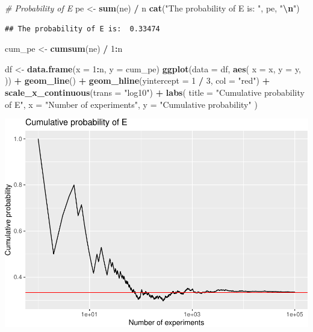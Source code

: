 \documentclass[
]{article}
\newenvironment{Shaded}{\begin{snugshade}}{\end{snugshade}}
\newcommand{\AttributeTok}[1]{\textcolor[rgb]{0.13,0.29,0.53}{#1}}
\newcommand{\CommentTok}[1]{\textcolor[rgb]{0.56,0.35,0.01}{\textit{#1}}}
\newcommand{\DecValTok}[1]{\textcolor[rgb]{0.00,0.00,0.81}{#1}}
\newcommand{\FunctionTok}[1]{\textcolor[rgb]{0.13,0.29,0.53}{\textbf{#1}}}
\newcommand{\NormalTok}[1]{#1}
\newcommand{\OtherTok}[1]{\textcolor[rgb]{0.56,0.35,0.01}{#1}}
\newcommand{\SpecialCharTok}[1]{\textcolor[rgb]{0.81,0.36,0.00}{\textbf{#1}}}
\newcommand{\StringTok}[1]{\textcolor[rgb]{0.31,0.60,0.02}{#1}}
\begin{document}
\begin{Shaded}
\begin{Highlighting}[]
\CommentTok{\# Probability of E}
\NormalTok{pe }\OtherTok{\textless{}{-}} \FunctionTok{sum}\NormalTok{(ne) }\SpecialCharTok{/}\NormalTok{ n}
\FunctionTok{cat}\NormalTok{(}\StringTok{"The probability of E is: "}\NormalTok{, pe, }\StringTok{"}\SpecialCharTok{\textbackslash{}n}\StringTok{"}\NormalTok{)}
\end{Highlighting}
\end{Shaded}

\begin{verbatim}
## The probability of E is:  0.33474
\end{verbatim}

\begin{Shaded}
\begin{Highlighting}[]
\NormalTok{cum\_pe }\OtherTok{\textless{}{-}} \FunctionTok{cumsum}\NormalTok{(ne) }\SpecialCharTok{/} \DecValTok{1}\SpecialCharTok{:}\NormalTok{n}

\NormalTok{df }\OtherTok{\textless{}{-}} \FunctionTok{data.frame}\NormalTok{(}\AttributeTok{x =} \DecValTok{1}\SpecialCharTok{:}\NormalTok{n, }\AttributeTok{y =}\NormalTok{ cum\_pe)}
\FunctionTok{ggplot}\NormalTok{(}\AttributeTok{data =}\NormalTok{ df, }\FunctionTok{aes}\NormalTok{(}
  \AttributeTok{x =}\NormalTok{ x, }\AttributeTok{y =}\NormalTok{ y,}
\NormalTok{)) }\SpecialCharTok{+}
  \FunctionTok{geom\_line}\NormalTok{() }\SpecialCharTok{+}
  \FunctionTok{geom\_hline}\NormalTok{(}\AttributeTok{yintercept =} \DecValTok{1} \SpecialCharTok{/} \DecValTok{3}\NormalTok{, }\AttributeTok{col =} \StringTok{"red"}\NormalTok{) }\SpecialCharTok{+}
  \FunctionTok{scale\_x\_continuous}\NormalTok{(}\AttributeTok{trans =} \StringTok{"log10"}\NormalTok{) }\SpecialCharTok{+}
  \FunctionTok{labs}\NormalTok{(}
    \AttributeTok{title =} \StringTok{"Cumulative probability of E"}\NormalTok{,}
    \AttributeTok{x =} \StringTok{"Number of experiments"}\NormalTok{, }\AttributeTok{y =} \StringTok{"Cumulative probability"}
\NormalTok{  )}
\end{Highlighting}
\end{Shaded}

\includegraphics{es_files/figure-latex/unnamed-chunk-6-1.pdf}
\end{document}
